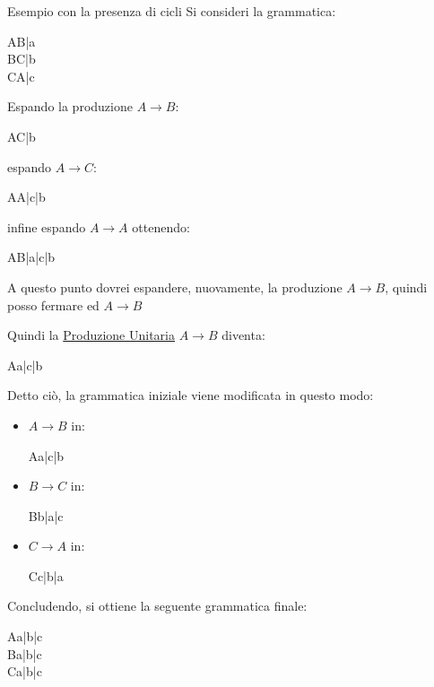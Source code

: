 \begin{example}{Esempio con la presenza di cicli}{}
    Si consideri la grammatica:
    \begin{ceq}
        A\to B|a \\
        B\to C|b \\
        C\to A|c
    \end{ceq}
    Espando la produzione $A\to B$:
    \begin{ceq}
        A\to C|b
    \end{ceq}
    espando $A\to C$:
    \begin{ceq}
        A\to A|c|b
    \end{ceq}
    infine espando $A\to A$ ottenendo:
    \begin{ceq}
        A\to B|a|c|b
    \end{ceq}
    A questo punto dovrei espandere, nuovamente, la produzione $A\to B$, quindi posso fermare ed  $A\to B$
    \begin{note}
        Quindi la \hyperref[def:prod-unit]{Produzione Unitaria} $A\to B$ diventa:
        \begin{ceq}
            A\to a|c|b
        \end{ceq}
    \end{note}
    Detto ciò, la grammatica iniziale viene modificata in questo modo:
    \begin{itemize}
        \item $A\to B$ in:
            \begin{ceq}
                A\to a|c|b
            \end{ceq}
        \item $B\to C$ in:
            \begin{ceq}
                B\to b|a|c
            \end{ceq}
        \item $C\to A$ in:
            \begin{ceq}
                C\to c|b|a
            \end{ceq}
    \end{itemize}
    Concludendo, si ottiene la seguente grammatica finale:
    \begin{ceq}
        A\to a|b|c \\
        B\to a|b|c \\
        C\to a|b|c \\
    \end{ceq}
\end{example}
%
